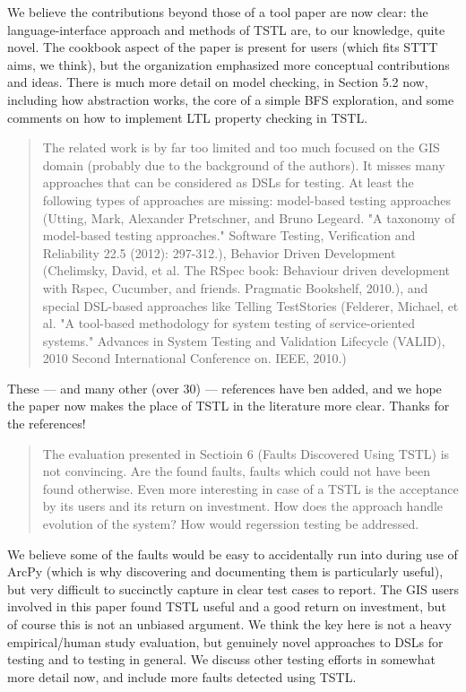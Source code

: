 \documentclass{article}[12pt]
\begin{document}
We believe the contributions beyond those of a tool paper are now clear:  the language-interface approach and methods of TSTL are, to our knowledge, quite novel.  The cookbook aspect of the paper is present for users (which fits STTT aims, we think), but the organization emphasized more conceptual contributions and ideas.  There is much more detail on model checking, in Section 5.2 now, including how abstraction works, the core of a simple BFS exploration, and some comments on how to implement LTL property checking in TSTL.

\begin{quote}
The related work is by far too limited and too much focused on the GIS domain 
(probably due to the background of the authors). It misses many approaches that can 
be considered as DSLs for testing. At least the following types of approaches are 
missing: model-based testing approaches (Utting, Mark, Alexander Pretschner, and 
Bruno Legeard. "A taxonomy of model-based testing approaches." Software Testing, 
Verification and Reliability 22.5 (2012): 297-312.), Behavior Driven Development 
(Chelimsky, David, et al. The RSpec book: Behaviour driven development with Rspec, 
Cucumber, and friends. Pragmatic Bookshelf, 2010.), and special DSL-based approaches 
like Telling TestStories (Felderer, Michael, et al. "A tool-based methodology for 
system testing of service-oriented systems." Advances in System Testing and 
Validation Lifecycle (VALID), 2010 Second International Conference on. IEEE, 2010.)
\end{quote}

These --- and many other (over 30) --- references have ben added, and we hope the paper now makes the place of TSTL in the literature more clear.  Thanks for the references!

\begin{quote}
The evaluation presented in Sectioin 6 (Faults Discovered Using TSTL) is not 
convincing. Are the found faults, faults which could not have been found otherwise. 
Even more interesting in case of a TSTL is the acceptance by its users and its 
return on investment. How does the approach handle evolution of the system? How 
would regerssion testing be addressed.
\end{quote}

We believe some of the faults would be easy to accidentally run into during use of ArcPy (which is why discovering and documenting them is particularly useful), but very difficult to succinctly capture in clear test cases to report.  The GIS users involved in this paper found TSTL useful and a good return on investment, but of course this is not an unbiased argument.  We think the key here is not a heavy empirical/human study evaluation, but genuinely novel approaches to DSLs for testing and to testing in general. We discuss other testing efforts in somewhat more detail now, and include more faults detected using TSTL.
\end{document}
